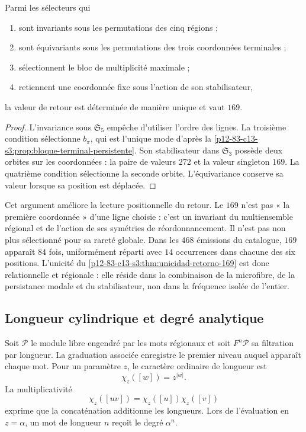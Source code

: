 \begin{theorem}
\label{p12-83-c13-s3:thm:unicidad-retorno-169}
Parmi les sélecteurs qui
\begin{enumerate}
  \item sont invariants sous les permutations des cinq régions ;
  \item sont équivariants sous les permutations des trois coordonnées
  terminales ;
  \item sélectionnent le bloc de multiplicité maximale ;
  \item retiennent une coordonnée fixe sous l'action de son stabilisateur,
\end{enumerate}
la valeur de retour est déterminée de manière unique et vaut \(169\).
\end{theorem}

\begin{proof}
L'invariance sous \(\mathfrak S_5\) empêche d'utiliser l'ordre des lignes. La
troisième condition sélectionne \(b_\pi\), qui est l'unique mode d'après la
\cref{p12-83-c13-s3:prop:bloque-terminal-persistente}. Son stabilisateur dans
\(\mathfrak S_3\) possède deux orbites sur les coordonnées : la paire de
valeurs \(272\) et la valeur singleton \(169\). La quatrième condition sélectionne la
seconde orbite. L'équivariance conserve sa valeur lorsque sa position est déplacée.
\end{proof}

Cet argument améliore la lecture positionnelle du retour. Le \(169\) n'est pas
« la première coordonnée » d'une ligne choisie : c'est un invariant du
multiensemble régional et de l'action de ses symétries de réordonnancement.
Il n'est pas non plus sélectionné pour sa rareté globale. Dans les \(468\) émissions du
catalogue, \(169\) apparaît \(84\) fois, uniformément réparti avec
\(14\) occurrences dans chacune des six positions. L'unicité du
\cref{p12-83-c13-s3:thm:unicidad-retorno-169} est donc relationnelle et régionale : elle réside
dans la combinaison de la microfibre, de la persistance modale et du stabilisateur, non dans la
fréquence isolée de l'entier.

\subsection{Longueur cylindrique et degré analytique}

Soit \(\mathcal P\) le module libre engendré par les mots régionaux et
soit \(F^n\mathcal P\) sa filtration par longueur. La graduation associée
enregistre le premier niveau auquel apparaît chaque mot. Pour un paramètre
\(z\), le caractère ordinaire de longueur est
\[
\chi_z([w])=z^{|w|}.
\]
La multiplicativité
\[
\chi_z([uv])=\chi_z([u])\chi_z([v])
\]
exprime que la concaténation additionne les longueurs. Lors de l'évaluation en
\(z=\alpha\), un mot de longueur \(n\) reçoit le degré \(\alpha^n\).

